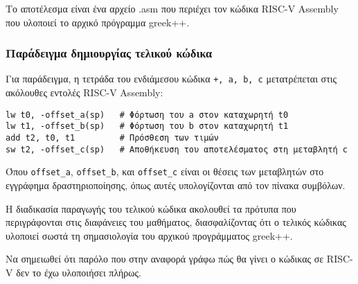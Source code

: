 \documentclass[12pt,a4paper]{article}
\begin{document}
Το αποτέλεσμα είναι ένα αρχείο .asm που περιέχει τον κώδικα RISC-V Assembly που υλοποιεί το αρχικό πρόγραμμα greek++.

\subsubsection{Παράδειγμα δημιουργίας τελικού κώδικα}

Για παράδειγμα, η τετράδα του ενδιάμεσου κώδικα \texttt{+, a, b, c} μετατρέπεται στις ακόλουθες εντολές RISC-V Assembly:

\begin{verbatim}
lw t0, -offset_a(sp)   # Φόρτωση του a στον καταχωρητή t0
lw t1, -offset_b(sp)   # Φόρτωση του b στον καταχωρητή t1
add t2, t0, t1         # Πρόσθεση των τιμών
sw t2, -offset_c(sp)   # Αποθήκευση του αποτελέσματος στη μεταβλητή c
\end{verbatim}

Όπου \texttt{offset\_a}, \texttt{offset\_b}, και \texttt{offset\_c} είναι οι θέσεις των μεταβλητών στο εγγράφημα δραστηριοποίησης, όπως αυτές υπολογίζονται από τον πίνακα συμβόλων.

Η διαδικασία παραγωγής του τελικού κώδικα ακολουθεί τα πρότυπα που περιγράφονται στις διαφάνειες του μαθήματος, διασφαλίζοντας ότι ο τελικός κώδικας υλοποιεί σωστά τη σημασιολογία του αρχικού προγράμματος greek++.

    Να σημειωθεί ότι παρόλο που στην αναφορά γράφω πώς θα γίνει ο κώδικας σε RISC-V δεν το έχω υλοποιήσει πλήρως.
\end{document}
